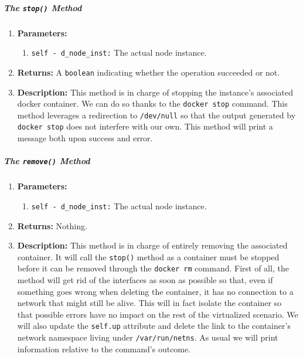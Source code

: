        \subparagraph{The \texttt{stop()} Method}
            \begin{enumerate}
                \item \textbf{Parameters:}
                \begin{enumerate}
                    \item \texttt{self - d\_node\_inst:} The actual node instance.
                \end{enumerate}
                \item \textbf{Returns:} A \texttt{boolean} indicating whether the operation succeeded or not.
                \item \textbf{Description:} This method is in charge of stopping the instance's associated docker container. We can do so thanks to the \texttt{docker stop} command. This method leverages a redirection to \texttt{/dev/null} so that the output generated by \texttt{docker stop} does not interfere with our own. This method will print a message both upon success and error.
            \end{enumerate}

        \subparagraph{The \texttt{remove()} Method}
            \begin{enumerate}
                \item \textbf{Parameters:}
                \begin{enumerate}
                    \item \texttt{self - d\_node\_inst:} The actual node instance.
                \end{enumerate}
                \item \textbf{Returns:} Nothing.
                \item \textbf{Description:} This method is in charge of entirely removing the associated container. It will call the \texttt{stop()} method as a container must be stopped before it can be removed through the \texttt{docker rm} command. First of all, the method will get rid of the interfaces as soon as possible so that, even if something goes wrong when deleting the container, it has no connection to a network that might still be alive. This will in fact isolate the container so that possible errors have no impact on the rest of the virtualized scenario. We will also update the \texttt{self.up} attribute and delete the link to the container's network namespace living under \texttt{/var/run/netns}. As usual we will print information relative to the command's outcome.
            \end{enumerate}

